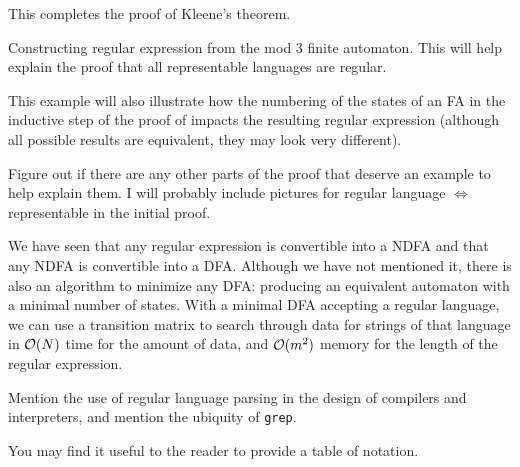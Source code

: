 \documentclass{bcthesis}
\renewcommand{\meo}{}
\begin{document}
	This completes the proof of Kleene's theorem.



\label{sec:examples}

	\begin{example}
		Constructing regular expression from the mod 3 finite automaton.
		This will help explain the proof that all representable languages are regular.

		This example will also illustrate how the numbering of the states of an FA in the inductive step of the proof of  impacts the resulting regular expression (although all possible results are equivalent, they may look very different).
	\end{example}

	\meo{
		Figure out if there are any other parts of the proof that deserve an example to help explain them.
		I will probably include pictures for regular language $\iff$ representable in the initial proof.
	}


\label{sec:motivation}
	\begin{remark}
		We have seen that any regular expression is convertible into a NDFA and that any NDFA is convertible into a DFA.
		Although we have not mentioned it, there is also an algorithm to minimize any DFA: producing an equivalent automaton with a minimal number of states. 
		With a minimal DFA accepting a regular language, we can use a transition matrix to search through data for strings of that language in $\mathcal{O}(N)$ time for the amount of data, and $\mathcal{O}(m^2)$ memory for the length of the regular expression.
	\end{remark}

	\begin{remark}
		Mention the use of regular language parsing in the design of compilers and interpreters, and mention the ubiquity of \texttt{grep}.
	\end{remark}




%
\label{ch:mathematical-notation}

You may find it useful to the reader to provide a table of notation. 

\label{ch:conclusion}
\end{document}
